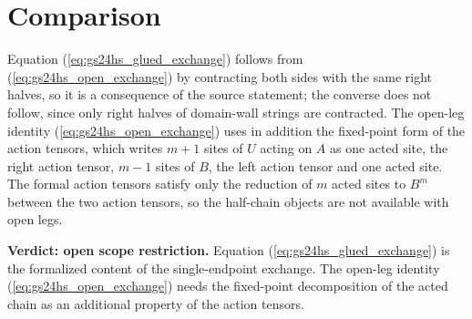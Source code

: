 \documentclass{article}
\begin{document}
\section{Comparison}

Equation (\ref{eq:gs24hs_glued_exchange}) follows from
(\ref{eq:gs24hs_open_exchange}) by contracting both sides with the same right
halves, so it is a consequence of the source statement; the converse does not
follow, since only right halves of domain-wall strings are contracted. The
open-leg identity (\ref{eq:gs24hs_open_exchange}) uses in addition the
fixed-point form of the action tensors, which writes $m+1$ sites of $U$ acting
on $A$ as one acted site, the right action tensor, $m-1$ sites of $B$, the
left action tensor and one acted site. The formal action tensors satisfy
only the reduction of $m$ acted sites to $B^m$ between the two action tensors,
so the half-chain objects are not available with open legs.

\textbf{Verdict: open scope restriction.} Equation
(\ref{eq:gs24hs_glued_exchange}) is the formalized content of the
single-endpoint exchange. The open-leg identity
(\ref{eq:gs24hs_open_exchange}) needs the fixed-point decomposition of the
acted chain as an additional property of the action tensors.



\end{document}
